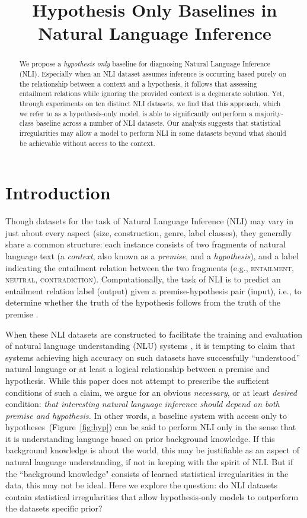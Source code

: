 \title{Hypothesis Only Baselines in Natural Language Inference}

\begin{abstract}
We propose a \emph{hypothesis only} baseline for diagnosing Natural Language Inference (NLI).  Especially when an NLI dataset assumes inference is occurring based purely on the relationship between a context and a hypothesis, it follows that assessing entailment relations while ignoring the provided context is a degenerate solution.  Yet, through experiments on ten distinct NLI datasets, we find that this approach, which we refer to as a hypothesis-only model, is able to significantly outperform a majority-class baseline across a number of NLI datasets.  Our analysis suggests that statistical irregularities may allow a model to perform NLI in some datasets beyond what should be achievable without access to the context.
\end{abstract}

\section{Introduction}
Though datasets for the task of Natural Language Inference (NLI) may vary in just about every aspect (size, construction, genre, label classes), they generally share a common structure: each instance consists of two fragments of natural language text (a \textit{context}, also known as a \textit{premise}, and a \textit{hypothesis}), and a label indicating the entailment relation between the two fragments (e.g., \textsc{entailment}, \textsc{neutral}, \textsc{contradiction}).
Computationally, the task of NLI is to predict an entailment relation label (output) given a premise-hypothesis pair (input), i.e., to determine whether the truth of the hypothesis follows from the truth of the premise \cite{dagan2006pascal,dagan2013recognizing}.

\iftrue

\fi When these NLI datasets are constructed to facilitate the training and evaluation of  natural language understanding (NLU) systems \cite{nangia2017repeval}, it is tempting to claim that systems achieving high accuracy on such datasets have successfully ``understood'' natural language or at least a logical relationship between a premise and hypothesis. While this paper does not attempt to prescribe the sufficient conditions of such a claim, we argue for an obvious \textit{necessary}, or at least \textit{desired} condition: \textit{that interesting natural language inference should depend on both premise and hypothesis.} In other words, a baseline system with access only to 
hypotheses~(Figure~\ref{fig:hyp}) can be said to perform NLI only in the sense that it is understanding language based on prior background knowledge. If this background knowledge is about the world, this may be justifiable as an aspect of natural language understanding, if not in keeping with the spirit of NLI. But if the ``background knowledge" consists of learned statistical irregularities in the data, this may not be ideal. Here we explore the question: do NLI datasets contain statistical irregularities that allow hypothesis-only models to outperform the datasets specific prior?

